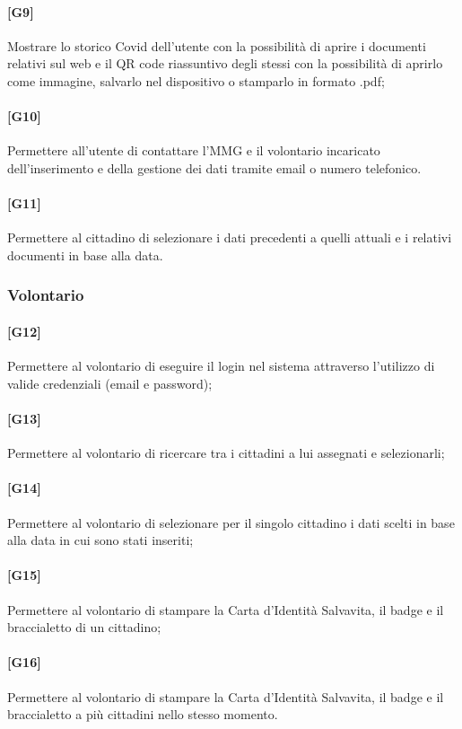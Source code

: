 \documentclass[12pt,a4paper,twoside,openright,titlepage]{book}
\begin{document}
\paragraph{[G9]} Mostrare lo storico Covid dell'utente con la possibilità di aprire i documenti relativi sul web e il QR code riassuntivo degli stessi con la possibilità di aprirlo come immagine, salvarlo nel dispositivo o stamparlo in formato .pdf;
\paragraph{[G10]} Permettere all'utente di contattare l'MMG e il volontario incaricato dell'inserimento e della gestione dei dati tramite email o numero telefonico.
\paragraph{[G11]} Permettere al cittadino di selezionare i dati precedenti a quelli attuali e i relativi documenti in base alla data.

\subsubsection{Volontario}
\paragraph{[G12]} Permettere al volontario di eseguire il login nel sistema attraverso l'utilizzo di valide credenziali (email e password);
\paragraph{[G13]} Permettere al volontario di ricercare tra i cittadini a lui assegnati e selezionarli;
\paragraph{[G14]} Permettere al volontario di selezionare per il singolo cittadino i dati scelti in base alla data in cui sono stati inseriti;
\paragraph{[G15]} Permettere al volontario di stampare la Carta d'Identità Salvavita, il badge e il braccialetto di un cittadino;
\paragraph{[G16]} Permettere al volontario di stampare la Carta d'Identità Salvavita, il badge e il braccialetto a più cittadini nello stesso momento.
\end{document}
